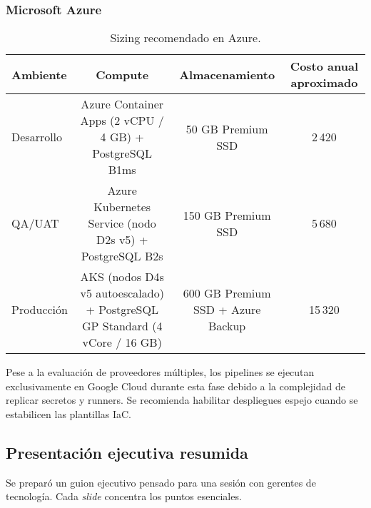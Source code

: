 \documentclass[12pt,a4paper]{article}
\begin{document}
\subsubsection{Microsoft Azure}

\begin{table}[htbp]
    \centering
    \caption{Sizing recomendado en Azure.}\label{tab:azure-costos}
    \begin{tabular}{lccc}
        \toprule
        Ambiente & Compute & Almacenamiento & Costo anual aproximado \\
        \midrule
        Desarrollo & Azure Container Apps (2 vCPU / 4 GB) + PostgreSQL B1ms & 50 GB Premium SSD & 2\,420 \\
        QA/UAT & Azure Kubernetes Service (nodo D2s v5) + PostgreSQL B2s & 150 GB Premium SSD & 5\,680 \\
        Producción & AKS (nodos D4s v5 autoescalado) + PostgreSQL GP Standard (4 vCore / 16 GB) & 600 GB Premium SSD + Azure Backup & 15\,320 \\
        \bottomrule
    \end{tabular}
\end{table}

\noindent Pese a la evaluación de proveedores múltiples, los pipelines se ejecutan exclusivamente en Google Cloud durante esta fase debido a la complejidad de replicar secretos y runners. Se recomienda habilitar despliegues espejo cuando se estabilicen las plantillas IaC.

\subsection{Presentación ejecutiva resumida}

Se preparó un guion ejecutivo pensado para una sesión con gerentes de tecnología. Cada \emph{slide} concentra los puntos esenciales.
\end{document}
